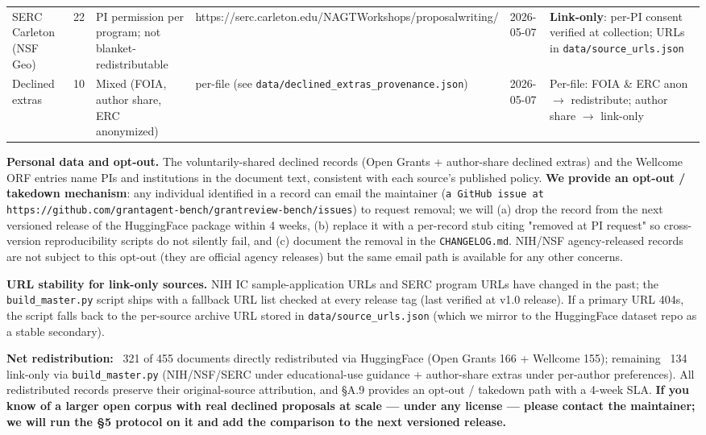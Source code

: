 \documentclass[11pt]{article}
\begin{document}
\begin{table}[H]
\begin{tabular}{llllll}
SERC Carleton (NSF Geo) & 22 & PI permission per program; not blanket-redistributable & https://serc.carleton.edu/NAGTWorkshops/proposalwriting/ & 2026-05-07 & \textbf{Link-only}: per-PI consent verified at collection; URLs in \texttt{data/source\_urls.json} \\
Declined extras & 10 & Mixed (FOIA, author share, ERC anonymized) & per-file (see \texttt{data/declined\_extras\_provenance.json}) & 2026-05-07 & Per-file: FOIA \& ERC anon $\rightarrow$ redistribute; author share $\rightarrow$ link-only \\
\bottomrule
\end{tabular}
\end{table}

\textbf{Personal data and opt-out.} The voluntarily-shared declined records (Open Grants + author-share declined extras) and the Wellcome ORF entries name PIs and institutions in the document text, consistent with each source's published policy. \textbf{We provide an opt-out / takedown mechanism}: any individual identified in a record can email the maintainer (\texttt{a GitHub issue at https://github.com/grantagent-bench/grantreview-bench/issues}) to request removal; we will (a) drop the record from the next versioned release of the HuggingFace package within 4 weeks, (b) replace it with a per-record stub citing "removed at PI request" so cross-version reproducibility scripts do not silently fail, and (c) document the removal in the \texttt{CHANGELOG.md}. NIH/NSF agency-released records are not subject to this opt-out (they are official agency releases) but the same email path is available for any other concerns.

\textbf{URL stability for link-only sources.} NIH IC sample-application URLs and SERC program URLs have changed in the past; the \texttt{build\_master.py} script ships with a fallback URL list checked at every release tag (last verified at v1.0 release). If a primary URL 404s, the script falls back to the per-source archive URL stored in \texttt{data/source\_urls.json} (which we mirror to the HuggingFace dataset repo as a stable secondary).

\textbf{Net redistribution:} ~321 of 455 documents directly redistributed via HuggingFace (Open Grants 166 + Wellcome 155); remaining ~134 link-only via \texttt{build\_master.py} (NIH/NSF/SERC under educational-use guidance + author-share extras under per-author preferences). All redistributed records preserve their original-source attribution, and §A.9 provides an opt-out / takedown path with a 4-week SLA. \textbf{If you know of a larger open corpus with real declined proposals at scale --- under any license --- please contact the maintainer; we will run the §5 protocol on it and add the comparison to the next versioned release.}
\end{document}
